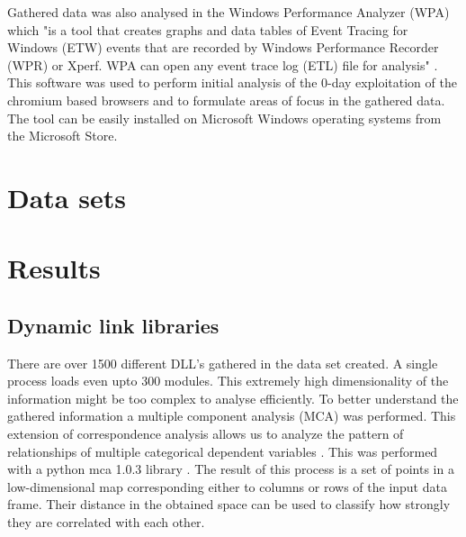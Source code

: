 \documentclass[a4paper,twoside,12pt]{book}
\begin{document}
Gathered data was also analysed in the Windows Performance Analyzer (WPA) which "is a tool that 
creates graphs and data tables of Event Tracing for Windows (ETW) events that are recorded 
by Windows Performance Recorder (WPR) or Xperf. WPA can open any event trace log (ETL) file 
for analysis" \cite{bib:wpa}. This software was used to perform initial analysis of the 0-day 
exploitation of the chromium based browsers and to formulate areas of focus in the gathered data. 
The tool can be easily installed on Microsoft Windows operating systems from the Microsoft Store.



\section{Data sets}


\section{Results}



\subsection{Dynamic link libraries}
There are over 1500 different DLL's gathered in the data set created. A single process loads 
even upto 300 modules. This extremely high dimensionality of the information might be too complex 
to analyse efficiently. To better understand the gathered information a multiple component 
analysis (MCA) was performed. This extension of correspondence analysis allows us to analyze the 
pattern of relationships of multiple categorical dependent variables \cite{bib:mca}. This was performed 
with a python mca 1.0.3 library \cite{bib:pymca}. The result of this process is a set of points in a 
low-dimensional map corresponding either to columns or rows of the input data frame. Their 
distance in the obtained space can be used to classify how strongly they are correlated with 
each other. 
\end{document}
